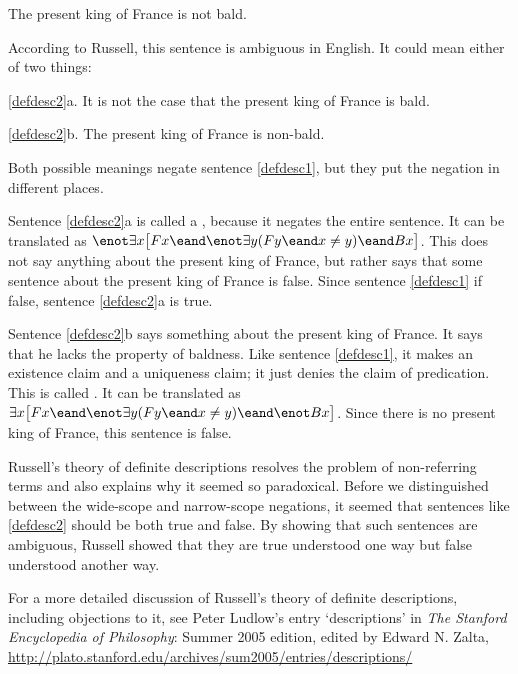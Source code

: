 

\begin{earg}
\item[\ex{defdesc2}] The present king of France is not bald.
\end{earg}
According to Russell, this sentence is ambiguous in English. It could mean either of two things:
\begin{earg}
\item[\ref{defdesc2}a.] It is not the case that the present king of France is bald.
\item[\ref{defdesc2}b.] The present king of France is non-bald.
\end{earg}
Both possible meanings negate sentence \ref{defdesc1}, but they put the negation in different places.

Sentence \ref{defdesc2}a is called a , because it negates the entire sentence. It can be translated as $\enot\exists x\bigl[Fx \eand \enot\exists y(Fy \eand x\neq y) \eand Bx\bigr]$. This does not say anything about the present king of France, but rather says that some sentence about the present king of France is false. Since sentence \ref{defdesc1} if false, sentence \ref{defdesc2}a is true.

Sentence \ref{defdesc2}b says something about the present king of France. It says that he lacks the property of baldness. Like sentence \ref{defdesc1}, it makes an existence claim and a uniqueness claim; it just denies the claim of predication. This is called . It can be translated as $\exists x\bigl[Fx \eand \enot\exists y(Fy \eand x\neq y) \eand \enot Bx\bigr]$. Since there is no present king of France, this sentence is false.

Russell's theory of definite descriptions resolves the problem of non-referring terms and also explains why it seemed so paradoxical. Before we distinguished between the wide-scope and narrow-scope negations, it seemed that sentences like \ref{defdesc2} should be both true and false. By showing that such sentences are ambiguous, Russell showed that they are true understood one way but false understood another way.

For a more detailed discussion of Russell's theory of definite descriptions, including objections to it, see Peter Ludlow's entry `descriptions' in \emph{The Stanford Encyclopedia of Philosophy}: Summer 2005 edition, edited by Edward N. Zalta, \url{http://plato.stanford.edu/archives/sum2005/entries/descriptions/}

